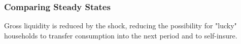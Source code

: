 \documentclass[12pt]{article} %
\numberwithin{equation}{section} %
\numberwithin{figure}{section}
\numberwithin{table}{section}
\begin{document}
\subsubsection*{Comparing Steady States}

Gross liquidity is reduced by the shock, reducing the possibility for "lucky" households to transfer consumption into the next period and to self-insure.

\end{document}
